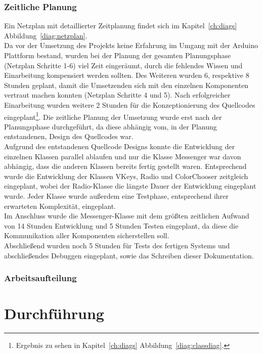 \documentclass[a4paper, 11pt]{scrartcl}
\begin{document}
\subsubsection{Zeitliche Planung}
Ein Netzplan mit detaillierter Zeitplanung findet sich im Kapitel~\ref{ch:diags} Abbildung~\ref{diag:netzplan}.
\\
Da vor der Umsetzung des Projekts keine Erfahrung im Umgang mit der Arduino Plattform bestand, wurden bei der Planung der gesamten Planungsphase (Netzplan Schritte 1-6) 
viel Zeit eingeräumt, durch die fehlendes Wissen und Einarbeitung kompensiert werden sollten. Des Weiteren wurden 6, respektive 8 Stunden geplant, damit die 
Umsetzenden sich mit den einzelnen Komponenten vertraut machen konnten (Netzplan Schritte 4 und 5). Nach erfolgreicher Einarbeitung wurden weitere 2 Stunden
für die Konzeptionierung des Quellcodes eingeplant\footnote{Ergebnis zu sehen in Kapitel~\ref{ch:diags} Abbildung~\ref{diag:classdiag}.}. Die zeitliche 
Planung der Umsetzung wurde erst nach der Planungsphase durchgeführt, da diese abhängig vom, in der Planung entstandenen, Design des Quellcodes war.
\\
Aufgrund des entstandenen Quellcode Designs konnte die Entwicklung der einzelnen Klassen parallel ablaufen und nur die Klasse \glqq Messenger\grqq{} war davon abhängig,
dass die anderen Klassen bereits fertig gestellt waren. Entsprechend wurde die Entwicklung der Klassen \glqq VKeys\grqq , \glqq Radio\grqq{} und \glqq ColorChooser\grqq{}
zeitgleich eingeplant, wobei der Radio-Klasse die längste Dauer der Entwicklung eingeplant wurde. Jeder Klasse wurde außerdem eine Testphase, entsprechend ihrer erwarteten
Komplexität, eingeplant.
\\
Im Anschluss wurde die Messenger-Klasse mit dem größten zeitlichen Aufwand von 14 Stunden Entwicklung und 5 Stunden Testen eingeplant, da diese die Kommunikation
aller Komponenten sicherstellen soll.
\\
Abschließend wurden noch 5 Stunden für Tests des fertigen Systems und abschließendes Debuggen eingeplant, sowie das Schreiben dieser Dokumentation.

\subsubsection{Arbeitsaufteilung}

\section{Durchführung}
\end{document}
